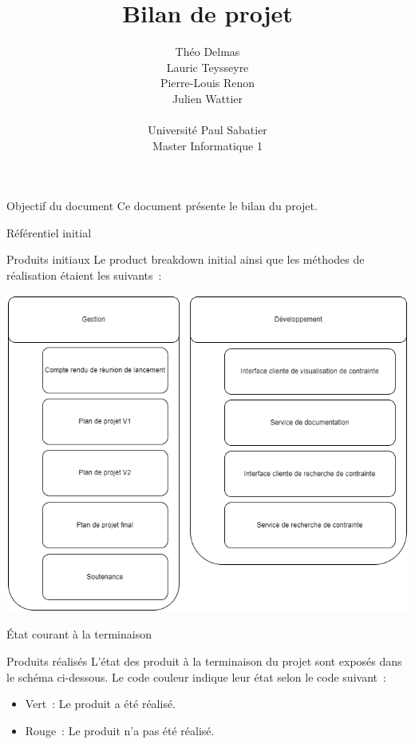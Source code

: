 \documentclass[]{article}
\title{Bilan de projet}
\author{
    Théo Delmas\\
    Lauric Teysseyre\\
    Pierre-Louis Renon\\
    Julien Wattier\\
    \\
    Université Paul Sabatier\\
    Master Informatique 1\\
   }
\begin{document}
\maketitle
\newpage
\tableofcontents
\newpage

\begin{section}{Objectif du document}
 Ce document présente le bilan du projet.
\end{section}

{
\setlength{\parindent}{0pt} %
\begin{section}{Référentiel initial}
 \begin{subsection}{Produits initiaux}
     Le product breakdown initial ainsi que les méthodes de réalisation étaient les suivants :

     \includegraphics[scale=0.5]{IMG/PBS_initial_bilan}
 \end{subsection}
\end{section}

\begin{section}{État courant à la terminaison}
 \begin{subsection}{Produits réalisés}
     L’état des produit à la terminaison du projet sont exposés dans le schéma ci-dessous. Le code couleur indique leur état selon le code suivant :

     \begin{itemize}
         \item Vert : Le produit a été réalisé.
         \item Rouge : Le produit n’a pas été réalisé.
     \end{itemize}


\end{subsection}
\end{section}}
\end{document}
